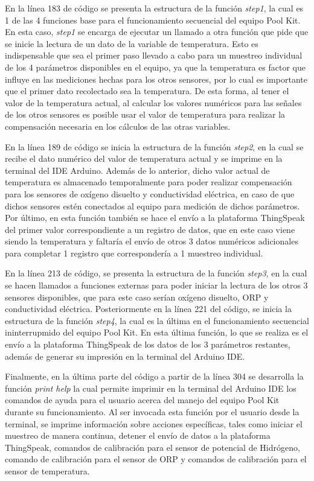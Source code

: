 En la línea 183 de código se presenta la estructura de la función \textit{step1}, la cual es 1 de las 4 funciones base para el funcionamiento secuencial del equipo Pool Kit. En esta caso, \textit{step1} se encarga de ejecutar 
un llamado a otra función que pide que se inicie la lectura de un dato de la variable de temperatura. Esto es indispensable que sea el primer paso llevado a cabo para un muestreo individual de los 4 parámetros disponibles 
en el equipo, ya que la temperatura es factor que influye en las mediciones hechas para los otros sensores, por lo cual es importante que el primer dato recolectado sea la temperatura. De esta forma, al tener el valor de la 
temperatura actual, al calcular los valores numéricos para las señales de los otros sensores es posible usar el valor de temperatura para realizar la compensación necesaria en los cálculos de las otras variables.

En la línea 189 de código se inicia la estructura de la función \textit{step2}, en la cual se recibe el dato numérico del valor de temperatura actual y se imprime en la terminal del IDE Arduino. Además de lo anterior, dicho 
valor actual de temperatura es almacenado temporalmente para poder realizar compensación para los sensores de oxígeno disuelto y conductividad eléctrica, en caso de que dichos sensores estén conectados al equipo para medición 
de dichos parámetros. Por último, en esta función también se hace el envío a la plataforma ThingSpeak del primer valor correspondiente a un registro de datos, que en este caso viene siendo la temperatura y faltaría el envío 
de otros 3 datos numéricos adicionales para completar 1 registro que correspondería a 1 muestreo individual.

En la línea 213 de código, se presenta la estructura de la función \textit{step3}, en la cual se hacen llamados a funciones externas para poder iniciar la lectura de los otros 3 sensores disponibles, que para este caso serían 
oxígeno disuelto, ORP y conductividad eléctrica. Posteriormente en la línea 221 del código, se inicia la estructura de la función \textit{step4}, la cual es la última en el funcionamiento secuencial ininterrupmido del equipo 
Pool Kit. En esta última función, lo que se realiza es el envío a la plataforma ThingSpeak de los datos de los 3 parámetros restantes, además de generar su impresión en la terminal del Arduino IDE.

Finalmente, en la última parte del código a partir de la línea 304 se desarrolla la función \textit{print help} la cual permite imprimir en la terminal del Arduino IDE los comandos de ayuda para el usuario acerca del manejo 
del equipo Pool Kit durante su funcionamiento. Al ser invocada esta función por el usuario desde la terminal, se imprime información sobre acciones específicas, tales como iniciar el muestreo de manera continua, detener 
el envío de datos a la plataforma ThingSpeak, comandos de calibración para el sensor de potencial de Hidrógeno, comando de calibración para el sensor de ORP y comandos de calibración para el sensor de temperatura.
